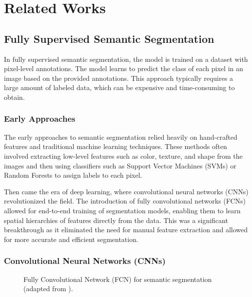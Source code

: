 \chapter {Related Works}
\label{chap:related-works}

\section{Fully Supervised Semantic Segmentation}
\label{sec:fully-supervised}

In fully supervised semantic segmentation, the model is trained on a dataset with pixel-level annotations. The model learns to predict the class of each pixel in an image based on the provided annotations. This approach typically requires a large amount of labeled data, which can be expensive and time-consuming to obtain.

\subsection{Early Approaches}
\label{subsec:early-approaches}
The early approaches to semantic segmentation relied heavily on hand-crafted features and traditional machine learning techniques. These methods often involved extracting low-level features such as color, texture, and shape from the images and then using classifiers such as Support Vector Machines (SVMs) or Random Forests to assign labels to each pixel.

Then came the era of deep learning, where convolutional neural networks (CNNs) revolutionized the field. The introduction of fully convolutional networks (FCNs) allowed for end-to-end training of segmentation models, enabling them to learn spatial hierarchies of features directly from the data. This was a significant breakthrough as it eliminated the need for manual feature extraction and allowed for more accurate and efficient segmentation.

\subsection{Convolutional Neural Networks (CNNs)}
\label{subsec:cnn_sem_seg}

\begin{figure}[htbp]
    \centering
    \caption{Fully Convolutional Network (FCN) for semantic segmentation (adapted from \cite{fsss_fcn}).}
    \label{fig:fcn}
\end{figure}

